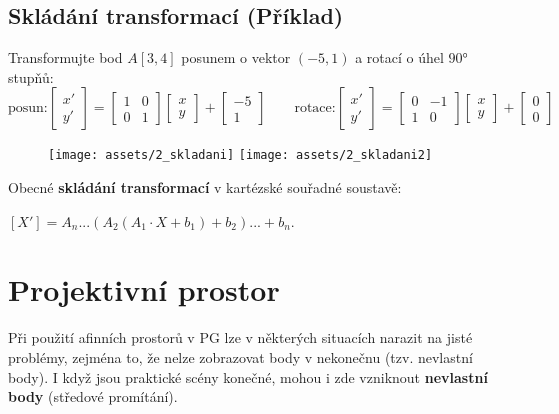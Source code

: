 \subsection*{Skládání transformací (Příklad)}
Transformujte bod $A[3,4]$ posunem o vektor $(-5,1)$ a rotací o úhel $\ang{90}$ stupňů:
\begin{equation*}
    \textrm{posun:}
    \begin{bmatrix}
        x' \\[0.3em]
        y'
    \end{bmatrix} =
    \begin{bmatrix}
        1 & 0 \\[0.3em]
        0 & 1
    \end{bmatrix}
    \begin{bmatrix}
        x \\[0.3em]
        y
    \end{bmatrix} +
    \begin{bmatrix}
        -5 \\[0.3em]
        1
    \end{bmatrix} \qquad \textrm{rotace:}
    \begin{bmatrix}
        x' \\[0.3em]
        y'
    \end{bmatrix} =
    \begin{bmatrix}
        0 & -1 \\[0.3em]
        1 & 0
    \end{bmatrix}
    \begin{bmatrix}
        x \\[0.3em]
        y
    \end{bmatrix} +
    \begin{bmatrix}
        0 \\[0.3em]
        0
    \end{bmatrix}
\end{equation*}
\begin{figure}[H]
    \centering
    \texttt{[image: assets/2\_skladani]}
    \texttt{[image: assets/2\_skladani2]}
\end{figure}
\noindent Obecné \textbf{skládání transformací} v kartézské souřadné soustavě:
\begin{center}
    $[X'] = A_n ...(A_2(A_1 \cdot X + b_1) + b_2) ... + b_n$.
\end{center}

\section{Projektivní prostor}
Při použití afinních prostorů v PG lze v některých situacích narazit na jisté problémy, zejména to, že nelze zobrazovat body v nekonečnu (tzv. nevlastní body). I když jsou praktické scény konečné, mohou i zde vzniknout \textbf{nevlastní body} (středové promítání).

